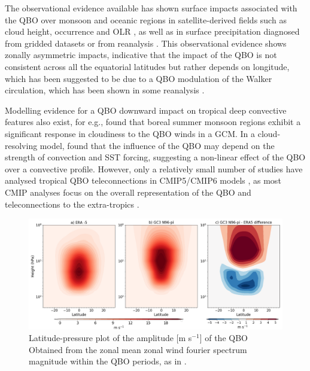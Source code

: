 The observational evidence available has shown surface impacts associated with the QBO over monsoon and oceanic regions in satellite-derived fields such as cloud height, occurrence and OLR \citep{collimore2003,liess2012}, as well as in surface precipitation diagnosed from gridded datasets or from reanalysis \citep{seo2013,gray2018}.
This observational evidence shows zonally asymmetric impacts, indicative that the impact of the QBO is not consistent across all the equatorial latitudes but rather depends on longitude, which has been suggested \citep[e.g. by][]{collimore2003,liess2012} to be due to a QBO modulation of the Walker circulation, which has been shown in some reanalysis \citep{yamazaki2020tropospheric,hitchman2021observational}.

Modelling evidence for a QBO downward impact on tropical deep convective features also exist, for e.g.,     \cite{giorgetta1999} found that boreal summer monsoon regions exhibit a significant response in cloudiness to the QBO winds in a GCM.
In a cloud-resolving model, \cite{nie2015} found that the influence of the QBO may depend on the strength of convection and SST forcing, suggesting a non-linear effect of the QBO over a convective profile.
However, only a relatively small number of studies have analysed tropical QBO teleconnections in CMIP5/CMIP6 models \citep{serva2021}, as most CMIP analyses focus on the overall representation of the QBO and teleconnections to the extra-tropics  \citep{richter2020,anstey2021}.
 
 
\begin{figure}[t!]
\centering
 \includegraphics[width=\linewidth]{figures/qboamplitude.png}
\caption[QBO amplitude bias]{Latitude-pressure plot of the amplitude [m s$^{-1}$] of the QBO  Obtained from the zonal mean zonal wind fourier spectrum magnitude within the QBO periods, as in \cite{schenzinger2017}. }
\label{fig:qboamplitude}
\end{figure} 



